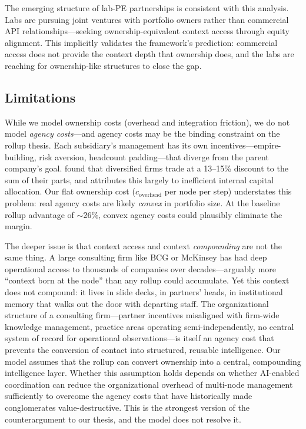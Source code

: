 \documentclass[12pt]{article}
\theoremstyle{definition}
\begin{document}
The emerging structure of lab-PE partnerships is consistent with this analysis. Labs are pursuing joint ventures with portfolio owners rather than commercial API relationships---seeking ownership-equivalent context access through equity alignment. This implicitly validates the framework's prediction: commercial access does not provide the context depth that ownership does, and the labs are reaching for ownership-like structures to close the gap.

\subsection{Limitations}

While we model ownership costs (overhead and integration friction), we do not model \textit{agency costs}---and agency costs may be the binding constraint on the rollup thesis. Each subsidiary's management has its own incentives---empire-building, risk aversion, headcount padding---that diverge from the parent company's goal. \citet{berger1995} found that diversified firms trade at a 13--15\% discount to the sum of their parts, and \citet{jensen1986} attributes this largely to inefficient internal capital allocation. Our flat ownership cost ($c_{\text{overhead}}$ per node per step) understates this problem: real agency costs are likely \textit{convex} in portfolio size. At the baseline rollup advantage of $\sim$26\%, convex agency costs could plausibly eliminate the margin.

The deeper issue is that context access and context \textit{compounding} are not the same thing. A large consulting firm like BCG or McKinsey has had deep operational access to thousands of companies over decades---arguably more ``context born at the node'' than any rollup could accumulate. Yet this context does not compound: it lives in slide decks, in partners' heads, in institutional memory that walks out the door with departing staff. The organizational structure of a consulting firm---partner incentives misaligned with firm-wide knowledge management, practice areas operating semi-independently, no central system of record for operational observations---is itself an agency cost that prevents the conversion of contact into structured, reusable intelligence. Our model assumes that the rollup can convert ownership into a central, compounding intelligence layer. Whether this assumption holds depends on whether AI-enabled coordination can reduce the organizational overhead of multi-node management sufficiently to overcome the agency costs that have historically made conglomerates value-destructive. This is the strongest version of the counterargument to our thesis, and the model does not resolve it.
\end{document}
